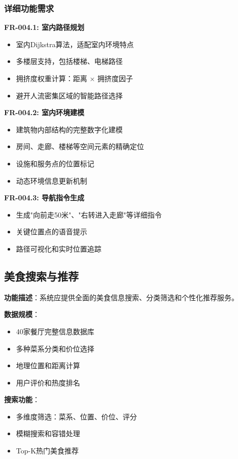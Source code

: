 \documentclass[12pt,a4paper]{article}
\begin{document}
\subsubsection{详细功能需求}

\textbf{FR-004.1: 室内路径规划}
\begin{itemize}
    \item 室内Dijkstra算法，适配室内环境特点
    \item 多楼层支持，包括楼梯、电梯路径
    \item 拥挤度权重计算：距离 × 拥挤度因子
    \item 避开人流密集区域的智能路径选择
\end{itemize}

\textbf{FR-004.2: 室内环境建模}
\begin{itemize}
    \item 建筑物内部结构的完整数字化建模
    \item 房间、走廊、楼梯等空间元素的精确定位
    \item 设施和服务点的位置标记
    \item 动态环境信息更新机制
\end{itemize}

\textbf{FR-004.3: 导航指令生成}
\begin{itemize}
    \item 生成"向前走50米"、"右转进入走廊"等详细指令
    \item 关键位置点的语音提示
    \item 路径可视化和实时位置追踪
\end{itemize}

\subsection{美食搜索与推荐}

\begin{reqbox}[title={FR-005: 美食搜索推荐}]
\textbf{功能描述}：系统应提供全面的美食信息搜索、分类筛选和个性化推荐服务。

\textbf{数据规模}：
\begin{itemize}[nosep]
    \item 40家餐厅完整信息数据库
    \item 多种菜系分类和价位选择
    \item 地理位置和距离计算
    \item 用户评价和热度排名
\end{itemize}

\textbf{搜索功能}：
\begin{itemize}[nosep]
    \item 多维度筛选：菜系、位置、价位、评分
    \item 模糊搜索和容错处理
    \item Top-K热门美食推荐
\end{itemize}
\end{reqbox}
\end{document}
